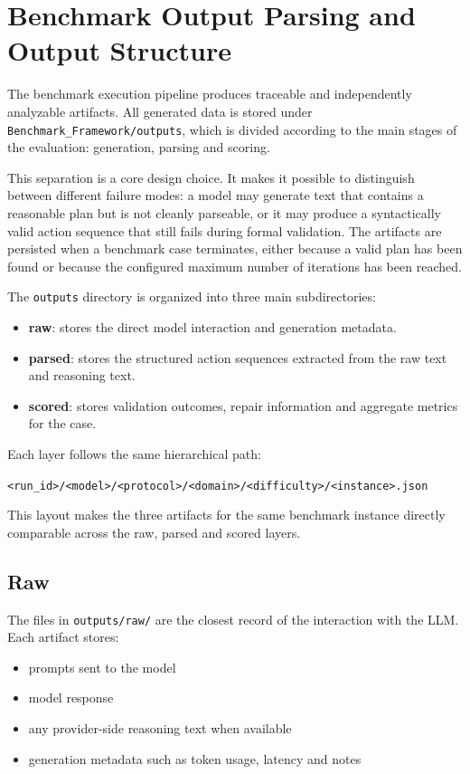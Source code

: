 \section{Benchmark Output Parsing and Output Structure}

The benchmark execution pipeline produces traceable and independently analyzable artifacts. All generated data is stored under \texttt{Benchmark\_Framework/outputs}, which is divided according to the main stages of the evaluation: generation, parsing and scoring.

This separation is a core design choice. It makes it possible to distinguish between different failure modes: a model may generate text that contains a reasonable plan but is not cleanly parseable, or it may produce a syntactically valid action sequence that still fails during formal validation. The artifacts are persisted when a benchmark case terminates, either because a valid plan has been found or because the configured maximum number of iterations has been reached.

The \texttt{outputs} directory is organized into three main subdirectories:
\begin{itemize}
    \item \textbf{raw}: stores the direct model interaction and generation metadata.
    \item \textbf{parsed}: stores the structured action sequences extracted from the raw text and reasoning text.
    \item \textbf{scored}: stores validation outcomes, repair information and aggregate metrics for the case.
\end{itemize}

Each layer follows the same hierarchical path:
\begin{center}
\texttt{<run\_id>/<model>/<protocol>/<domain>/<difficulty>/<instance>.json}
\end{center}
This layout makes the three artifacts for the same benchmark instance directly comparable across the raw, parsed and scored layers.


\subsection{Raw}

The files in \texttt{outputs/raw/} are the closest record of the interaction with the LLM. Each artifact stores: 
\begin{itemize}
  \item prompts sent to the model
  \item model response
  \item any provider-side reasoning text when available
  \item generation metadata such as token usage, latency and notes
\end{itemize}

